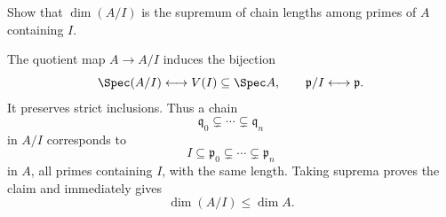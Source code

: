 \begin{problem}\label{prob:vi29-08}
Show that \(\dim(A/I)\) is the supremum of chain lengths among primes of \(A\) containing \(I\).

\end{problem}

\ifdefined\FullProblemDossiers
\begin{solution}
The quotient map \(A\to A/I\) induces the bijection
\[
\Spec(A/I)\longleftrightarrow V(I)\subseteq\Spec A,
\qquad
\mathfrak p/I\longleftrightarrow\mathfrak p.
\]
It preserves strict inclusions.  Thus a chain
\[
\mathfrak q_0\subsetneq\cdots\subsetneq\mathfrak q_n
\]
in \(A/I\) corresponds to
\[
I\subseteq\mathfrak p_0\subsetneq\cdots\subsetneq\mathfrak p_n
\]
in \(A\), all primes containing \(I\), with the same length.  Taking suprema proves the claim and immediately gives
\[
\dim(A/I)\le\dim A.
\]
\end{solution}
\fi
